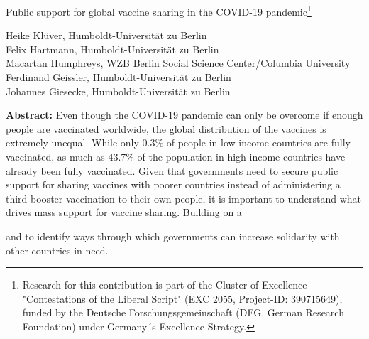\documentclass[12pt,oneside,smallheadings,chapterprefix=true]{article}
\begin{document}

\setlength{\textwidth}{14.0cm}

\onehalfspacing

\vspace*{0.7cm}
\begin{center}
\begin{huge}
Public support for global vaccine sharing in the COVID-19 pandemic\footnote{Research for this contribution is part of the Cluster of Excellence "Contestations of the Liberal Script" (EXC 2055, Project-ID: 390715649), funded by the Deutsche Forschungsgemeinschaft (DFG, German Research Foundation) under Germany´s Excellence Strategy.}
\end{huge}
\end{center}

\vspace*{0.5cm}

\begin{center}
Heike Klüver, Humboldt-Universität zu Berlin \\
Felix Hartmann, Humboldt-Universität zu Berlin \\ 
Macartan Humphreys, WZB Berlin Social Science Center/Columbia University \\
Ferdinand Geissler, Humboldt-Universität zu Berlin \\
Johannes Giesecke, Humboldt-Universität zu Berlin



\end{center}		
		
		
		\vspace*{1cm}
										
								

\singlespacing
\begin{sloppypar}
	\textbf{Abstract:} 
Even though the COVID-19 pandemic can only be overcome if enough people are vaccinated worldwide, the global distribution of the vaccines is extremely unequal. While only 0.3\% of people in low-income countries are fully vaccinated, as much as 43.7\% of the population in high-income countries have already been fully vaccinated. Given that governments need to secure public support for sharing vaccines with poorer countries instead of administering a third booster vaccination to their own people, it is important to understand what drives mass support for vaccine sharing. Building on a 


 and to identify ways through which governments can increase solidarity with other countries in need. 


\end{sloppypar}
\end{document}
